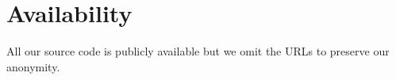 \section*{Availability}

All our source code is publicly available but we omit the URLs to preserve our
anonymity.

% 
